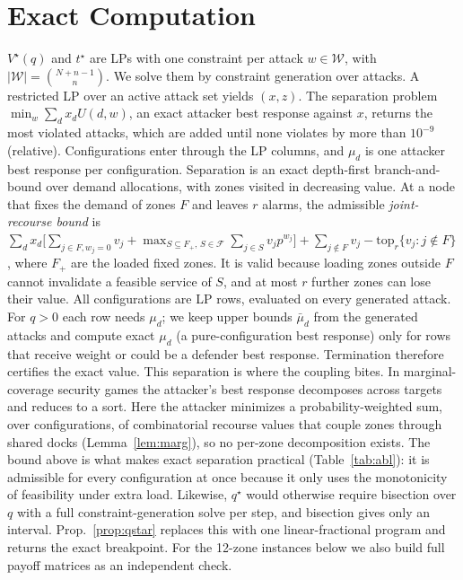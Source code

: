 \documentclass[letterpaper,journal]{IEEEtran}
\theoremstyle{remark}
\newcommand{\W}{\mathcal{W}}
\begin{document}
\section{Exact Computation}\label{sec:alg}
$V^\star(q)$ and $t^\star$ are LPs with one constraint per attack $w\in\W$, with $|\W|=\binom{N+n-1}{n}$. We solve them by constraint generation over attacks. A restricted LP over an active attack set yields $(x,z)$. The separation problem $\min_w\sum_dx_dU(d,w)$, an exact attacker best response against $x$, returns the most violated attacks, which are added until none violates by more than $10^{-9}$ (relative). Configurations enter through the LP columns, and $\mu_d$ is one attacker best response per configuration. Separation is an exact depth-first branch-and-bound over demand allocations, with zones visited in decreasing value. At a node that fixes the demand of zones $F$ and leaves $r$ alarms, the admissible \emph{joint-recourse bound} is $\sum_d x_d\big[\sum_{j\in F,w_j=0}v_j+\max_{S\subseteq F_+,\,S\in\mathcal{F}}\sum_{j\in S}v_jp^{w_j}\big]+\sum_{j\notin F}v_j-\mathrm{top}_r\{v_j:j\notin F\}$, where $F_+$ are the loaded fixed zones. It is valid because loading zones outside $F$ cannot invalidate a feasible service of $S$, and at most $r$ further zones can lose their value. All configurations are LP rows, evaluated on every generated attack. For $q>0$ each row needs $\mu_d$; we keep upper bounds $\bar\mu_d$ from the generated attacks and compute exact $\mu_d$ (a pure-configuration best response) only for rows that receive weight or could be a defender best response. Termination therefore certifies the exact value. This separation is where the coupling bites. In marginal-coverage security games the attacker's best response decomposes across targets and reduces to a sort. Here the attacker minimizes a probability-weighted sum, over configurations, of combinatorial recourse values that couple zones through shared docks (Lemma~\ref{lem:marg}), so no per-zone decomposition exists. The bound above is what makes exact separation practical (Table~\ref{tab:abl}): it is admissible for every configuration at once because it only uses the monotonicity of feasibility under extra load. Likewise, $q^\star$ would otherwise require bisection over $q$ with a full constraint-generation solve per step, and bisection gives only an interval. Prop.~\ref{prop:qstar} replaces this with one linear-fractional program and returns the exact breakpoint. For the 12-zone instances below we also build full payoff matrices as an independent check.
\end{document}
